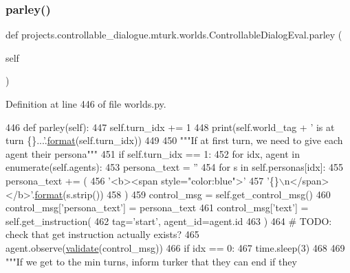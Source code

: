 \subsubsection{\texorpdfstring{parley()}{parley()}}
{\footnotesize\ttfamily def projects.\+controllable\+\_\+dialogue.\+mturk.\+worlds.\+Controllable\+Dialog\+Eval.\+parley (\begin{DoxyParamCaption}\item[{}]{self }\end{DoxyParamCaption})}



Definition at line 446 of file worlds.\+py.


\begin{DoxyCode}
446     \textcolor{keyword}{def }parley(self):
447         self.turn\_idx += 1
448         print(self.world\_tag + \textcolor{stringliteral}{' is at turn \{\}...'}.\hyperlink{namespaceparlai_1_1chat__service_1_1services_1_1messenger_1_1shared__utils_a32e2e2022b824fbaf80c747160b52a76}{format}(self.turn\_idx))
449 
450         \textcolor{stringliteral}{"""If at first turn, we need to give each agent their persona"""}
451         \textcolor{keywordflow}{if} self.turn\_idx == 1:
452             \textcolor{keywordflow}{for} idx, agent \textcolor{keywordflow}{in} enumerate(self.agents):
453                 persona\_text = \textcolor{stringliteral}{''}
454                 \textcolor{keywordflow}{for} s \textcolor{keywordflow}{in} self.personas[idx]:
455                     persona\_text += (
456                         \textcolor{stringliteral}{'<b><span style="color:blue">'}
457                         \textcolor{stringliteral}{'\{\}\(\backslash\)n</span></b>'}.\hyperlink{namespaceparlai_1_1chat__service_1_1services_1_1messenger_1_1shared__utils_a32e2e2022b824fbaf80c747160b52a76}{format}(s.strip())
458                     )
459                 control\_msg = self.get\_control\_msg()
460                 control\_msg[\textcolor{stringliteral}{'persona\_text'}] = persona\_text
461                 control\_msg[\textcolor{stringliteral}{'text'}] = self.get\_instruction(
462                     tag=\textcolor{stringliteral}{'start'}, agent\_id=agent.id
463                 )
464                 \textcolor{comment}{# TODO: check that get instruction actually exists?}
465                 agent.observe(\hyperlink{namespaceparlai_1_1core_1_1worlds_afc3fad603b7bce41dbdc9cdc04a9c794}{validate}(control\_msg))
466                 \textcolor{keywordflow}{if} idx == 0:
467                     time.sleep(3)
468 
469         \textcolor{stringliteral}{"""If we get to the min turns, inform turker that they can end if they}

\end{DoxyCode}
